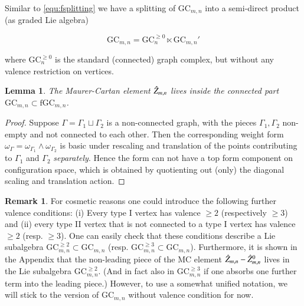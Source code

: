 \documentclass[a4paper]{amsart}
\theoremstyle{plain}
\newtheorem{lemma}[thm]{Lemma}
\theoremstyle{definition}
\newtheorem{rem}{Remark}
\newcommand{\fGCc}{\GC^{\geq 0}}
\newcommand{\GC}{\mathrm{GC}}
\newcommand{\fGC}{\mathrm{fGC}}
\newcommand{\beq}[1]{
\begin{equation}\label{#1}
}
\newcommand{\eeq}{
\end{equation}
}
\begin{document}
Similar to \eqref{equ:fsplitting} we have a splitting of $\GC_{m,n}$ into a semi-direct product (as graded Lie algebra) 
\beq{equ:splitting}
\GC_{m,n} = \fGCc_n \ltimes \GC_{m,n}'
\eeq
where $\fGCc_n$ is the standard (connected) graph complex, but without any valence restriction on vertices.

\begin{lemma}
The Maurer-Cartan element $\hat Z_{m,n}$ lives inside the connected part $\GC_{m,n}\subset \fGC_{m,n}$.
\end{lemma}
\begin{proof}
Suppose $\Gamma=\Gamma_1\sqcup \Gamma_2$ is a non-connected graph, with the pieces $\Gamma_1,\Gamma_2$ non-empty and not connected to each other. Then the corresponding weight form $\omega_\Gamma=\omega_{\Gamma_1}\wedge \omega_{\Gamma_2}$ is 
basic under rescaling and translation of the points contributing to $\Gamma_1$ and $\Gamma_2$ \emph{separately}. 
Hence the form can not have a top form component on configuration space, which is obtained by quotienting out (only) the diagonal scaling and translation action. 
\end{proof}

\begin{rem}
For cosmetic reasons one could introduce the following further valence conditions:
(i) Every type I vertex has valence $\geq 2$ (respectively $\geq 3$) and (ii) every type II vertex that is not connected to a type I vertex has valence $\geq 2$ (resp. $\geq 3$).
One can easily check that these conditions describe a Lie subalgebra $\GC_{m,n}^{\geq 2}\subset \GC_{m,n}$ (resp. $\GC_{m,n}^{\geq 3}\subset \GC_{m,n}$).
Furthermore, it is shown in the Appendix that the non-leading piece of the MC element $\hat Z_{m,n}-\hat Z_{m,n}^0$ lives in the Lie subalgebra $\GC_{m,n}^{\geq 2}$.
(And in fact also in $\GC_{m,n}^{\geq 3}$ if one absorbs one further term into the leading piece.)
However, to use a somewhat unified notation, we will stick to the version of $\GC_{m,n}$ without valence condition for now.
\end{rem}
\end{document}
